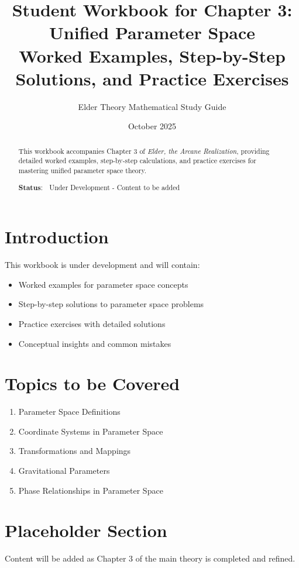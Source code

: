 \documentclass[12pt,a4paper]{article}
\title{\textbf{Student Workbook for Chapter 3:}\\
\Large{Unified Parameter Space}\\
\large{Worked Examples, Step-by-Step Solutions, and Practice Exercises}}
\author{Elder Theory Mathematical Study Guide}
\date{October 2025}
\theoremstyle{definition}
\theoremstyle{remark}
\begin{document}
\maketitle

\begin{abstract}
This workbook accompanies Chapter 3 of \textit{Elder, the Arcane Realization}, providing detailed worked examples, step-by-step calculations, and practice exercises for mastering unified parameter space theory.

\textbf{Status}: 🚧 Under Development - Content to be added
\end{abstract}

\tableofcontents
\newpage

\section{Introduction}

This workbook is under development and will contain:

\begin{itemize}
    \item Worked examples for parameter space concepts
    \item Step-by-step solutions to parameter space problems
    \item Practice exercises with detailed solutions
    \item Conceptual insights and common mistakes
\end{itemize}

\section{Topics to be Covered}

\begin{enumerate}
    \item Parameter Space Definitions
    \item Coordinate Systems in Parameter Space
    \item Transformations and Mappings
    \item Gravitational Parameters
    \item Phase Relationships in Parameter Space
\end{enumerate}

\section{Placeholder Section}

Content will be added as Chapter 3 of the main theory is completed and refined.
\end{document}
